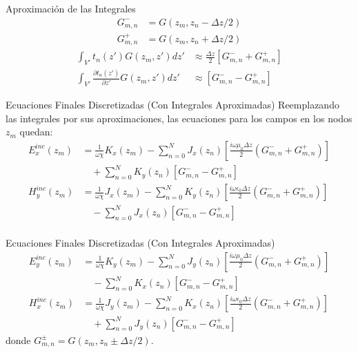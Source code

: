 \documentclass{beamer}
\begin{document}
\begin{frame}{Aproximación de las Integrales}
    \begin{align*}
        G_{m,n}^{-} &= G(z_m, z_n - \Delta z/2) \\
        G_{m,n}^{+} &= G(z_m, z_n + \Delta z/2)
    \end{align*}
    \begin{align*}
        \int_{V'} t_n(z') G(z_m, z') dz' &\approx \frac{\Delta z}{2} \left[ G_{m,n}^{-} + G_{m,n}^{+} \right] \\
        \int_{V'} \frac{\partial t_n(z')}{\partial z'} G(z_m, z') dz' &\approx \left[ G_{m,n}^{-} - G_{m,n}^{+} \right]
    \end{align*}
\end{frame}

\begin{frame}{Ecuaciones Finales Discretizadas (Con Integrales Aproximadas)}
    Reemplazando las integrales por sus aproximaciones, las ecuaciones para los campos en los nodos $z_m$ quedan:
    \begin{align*}
        E_x^{inc}(z_m) &= \frac{1}{\omega\chi} K_x(z_m) - \sum_{n=0}^{N} J_x(z_n) \left[ \frac{i\omega\mu_0 \Delta z}{2} (G_{m,n}^{-} + G_{m,n}^{+}) \right] \\
        &\quad + \sum_{n=0}^{N} K_y(z_n) \left[ G_{m,n}^{-} - G_{m,n}^{+} \right] \\[1em]
        H_y^{inc}(z_m) &= \frac{1}{\omega\chi} J_x(z_m) - \sum_{n=0}^{N} K_y(z_n) \left[ \frac{i\omega\epsilon_0 \Delta z}{2} (G_{m,n}^{-} + G_{m,n}^{+}) \right] \\
        &\quad - \sum_{n=0}^{N} J_x(z_n) \left[ G_{m,n}^{-} - G_{m,n}^{+} \right] \\[2em]
    \end{align*}
\end{frame}

\begin{frame}{Ecuaciones Finales Discretizadas (Con Integrales Aproximadas)}
    \begin{align*}
        E_y^{inc}(z_m) &= \frac{1}{\omega\chi} K_y(z_m) - \sum_{n=0}^{N} J_y(z_n) \left[ \frac{i\omega\mu_0 \Delta z}{2} (G_{m,n}^{-} + G_{m,n}^{+}) \right] \\
        &\quad - \sum_{n=0}^{N} K_x(z_n) \left[ G_{m,n}^{-} - G_{m,n}^{+} \right] \\[1em]
        H_x^{inc}(z_m) &= \frac{1}{\omega\chi} J_y(z_m) - \sum_{n=0}^{N} K_x(z_n) \left[ \frac{i\omega\epsilon_0 \Delta z}{2} (G_{m,n}^{-} + G_{m,n}^{+}) \right] \\
        &\quad + \sum_{n=0}^{N} J_y(z_n) \left[ G_{m,n}^{-} - G_{m,n}^{+} \right]
    \end{align*}
    donde $G_{m,n}^{\pm} = G(z_m, z_n \pm \Delta z/2)$.
\end{frame}
\end{document}
